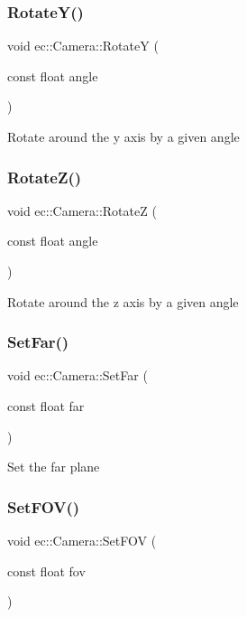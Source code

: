 \subsubsection{\texorpdfstring{Rotate\+Y()}{RotateY()}}
{\footnotesize\ttfamily void ec\+::\+Camera\+::\+RotateY (\begin{DoxyParamCaption}\item[{const float}]{angle }\end{DoxyParamCaption})}

Rotate around the y axis by a given angle \mbox{\label{classec_1_1_camera_a5cd0489cfedea9b16f8ce21cf3474978}} 
\subsubsection{\texorpdfstring{Rotate\+Z()}{RotateZ()}}
{\footnotesize\ttfamily void ec\+::\+Camera\+::\+RotateZ (\begin{DoxyParamCaption}\item[{const float}]{angle }\end{DoxyParamCaption})}

Rotate around the z axis by a given angle \mbox{\label{classec_1_1_camera_adb376b3c35aed1e7681f74ddbbe9fa25}} 
\subsubsection{\texorpdfstring{Set\+Far()}{SetFar()}}
{\footnotesize\ttfamily void ec\+::\+Camera\+::\+Set\+Far (\begin{DoxyParamCaption}\item[{const float}]{far }\end{DoxyParamCaption})}

Set the far plane \mbox{\label{classec_1_1_camera_a9af6e8b9a37d5494b5ddf6f098f463bc}} 
\subsubsection{\texorpdfstring{Set\+F\+O\+V()}{SetFOV()}}
{\footnotesize\ttfamily void ec\+::\+Camera\+::\+Set\+F\+OV (\begin{DoxyParamCaption}\item[{const float}]{fov }\end{DoxyParamCaption})}

